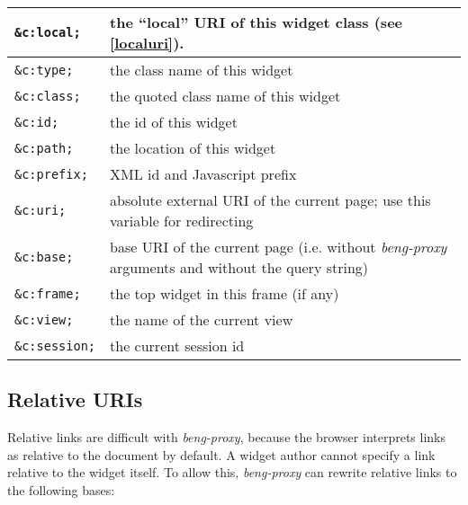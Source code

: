 \documentclass[a4paper,12pt]{article}
\begin{document}
\begin{tabular}{|l|p{8cm}|}
\hline

\texttt{\&c:local;} & the ``local'' URI of this widget class (see
\ref{localuri}). \\

\hline

\texttt{\&c:type;} & the class name of this widget \\

\hline

\texttt{\&c:class;} & the quoted class name of this widget \\

\hline

\texttt{\&c:id;} & the id of this widget \\

\hline
\texttt{\&c:path;} & the location of this widget \\
\hline
\texttt{\&c:prefix;} & XML id and Javascript prefix \\
\hline
\texttt{\&c:uri;} & absolute external URI of the current page; use
this variable for redirecting \\
\hline

\texttt{\&c:base;} & base URI of the current page (i.e. without
\emph{beng-proxy} arguments and without the query string) \\

\hline
\texttt{\&c:frame;} & the top widget in this frame (if any) \\
\hline

\texttt{\&c:view;} & the name of the current view \\

\hline
\texttt{\&c:session;} & the current session id \\
\hline
\end{tabular}

\subsection{Relative URIs}
\label{rewrite}

Relative links are difficult with \emph{beng-proxy}, because the
browser interprets links as relative to the document by default.  A
widget author cannot specify a link relative to the widget itself.  To
allow this, \emph{beng-proxy} can rewrite relative links to the
following bases:
\end{document}
